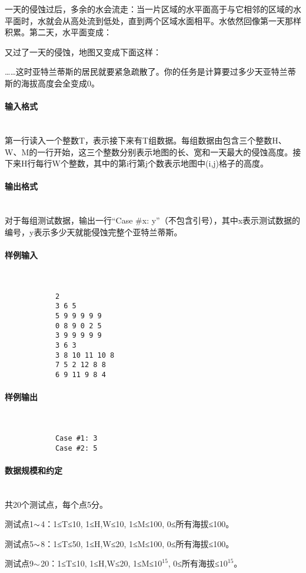 \documentclass[UTF8]{ctexart}
\newcommand{\myparagraph}[1]{\paragraph{#1}\mbox{}\\}
\begin{document}
		一天的侵蚀过后，多余的水会流走：当一片区域的水平面高于与它相邻的区域的水平面时，水就会从高处流到低处，直到两个区域水面相平。水依然回像第一天那样积累。第二天，水平面变成：
		
		\begin{center}\end{center}
		
		又过了一天的侵蚀，地图又变成下面这样：
		
		\begin{center}\end{center}
		
		……这时亚特兰蒂斯的居民就要紧急疏散了。你的任务是计算要过多少天亚特兰蒂斯的海拔高度会全变成0。
		
	\myparagraph{输入格式}
		
		第一行读入一个整数T，表示接下来有T组数据。每组数据由包含三个整数H、W、M的一行开始，这三个整数分别表示地图的长、宽和一天最大的侵蚀高度。接下来H行每行W个整数，其中的第i行第j个数表示地图中(i,j)格子的高度。
		
	\myparagraph{输出格式}
	
		对于每组测试数据，输出一行“Case \#x: y”（不包含引号），其中x表示测试数据的编号，y表示多少天就能侵蚀完整个亚特兰蒂斯。
		
	\myparagraph{样例输入}
	
		\begin{verbatim}
			2
			3 6 5
			5 9 9 9 9 9
			0 8 9 0 2 5
			3 9 9 9 9 9
			3 6 3
			3 8 10 11 10 8
			7 5 2 12 8 8
			6 9 11 9 8 4
		\end{verbatim}
		
	\myparagraph{样例输出}

		\begin{verbatim}
			Case #1: 3
			Case #2: 5
		\end{verbatim}
	
	\myparagraph{数据规模和约定}
	
		共20个测试点，每个点5分。
		
		测试点1$\scriptsize{\sim}$4：1≤T≤10, 1≤H,W≤10, 1≤M≤100, 0≤所有海拔≤100。
		
		测试点5$\scriptsize{\sim}$8：1≤T≤50, 1≤H,W≤20, 1≤M≤100, 0≤所有海拔≤100。
		
		测试点9$\scriptsize{\sim}$20：1≤T≤10, 1≤H,W≤20, 1≤M≤$10^{15}$, 0≤所有海拔≤$10^{15}$。
\end{document}
